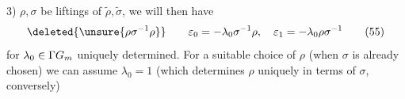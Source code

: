 3)  $\rho,\sigma$ be liftings of
$\widetilde\rho,\widetilde\sigma$, we will then have
\[
  \deleted{\unsure{\rho\sigma^{-1}\rho}}\qquad
  \varepsilon_0=-\lambda_0\sigma^{-1}\rho,\quad
  \varepsilon_1=-\lambda_0\rho\sigma^{-1} \tag{55}
\]
for $\lambda_0\in\Gamma\mathbb \mathbb G_m$ uniquely determined.
For a suitable choice of $\rho$ (when $\sigma$ is already chosen)
we can assume $\lambda_0=1$
(which determines $\rho$ uniquely in
 terms of $\sigma$,  conversely)

